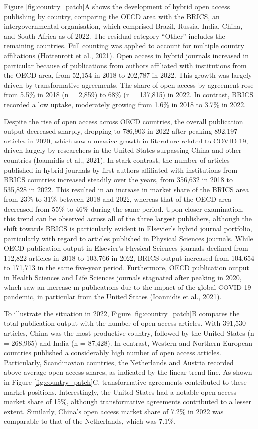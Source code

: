 \documentclass[a4paper,man,floatsintext,longtable,noextraspace,12pt]{apa6}
\begin{document}
Figure \ref{fig:country_patch}A shows the development of hybrid open
access publishing by country, comparing the OECD area with the BRICS, an
intergovernmental organisation, which comprised Brazil, Russia, India,
China, and South Africa as of 2022. The residual category ``Other''
includes the remaining countries. Full counting was applied to account
for multiple country affiliations (Hottenrott et al., 2021). Open access
in hybrid journals increased in particular because of publications from
authors affiliated with institutions from the OECD area, from 52,154 in
2018 to 202,787 in 2022. This growth was largely driven by
transformative agreements. The share of open access by agreement rose
from 5.5\% in 2018 (n = 2,859) to 68\% (n = 137,815) in 2022. In
contrast, BRICS recorded a low uptake, moderately growing from 1.6\% in
2018 to 3.7\% in 2022.

Despite the rise of open access across OECD countries, the overall
publication output decreased sharply, dropping to 786,903 in 2022 after
peaking 892,197 articles in 2020, which saw a massive growth in
literature related to COVID-19, driven largely by researchers in the
United States surpassing China and other countries (Ioannidis et al.,
2021). In stark contrast, the number of articles published in hybrid
journals by first authors affiliated with institutions from BRICS
countries increased steadily over the years, from 356,632 in 2018 to
535,828 in 2022. This resulted in an increase in market share of the
BRICS area from 23\% to 31\% between 2018 and 2022, whereas that of the
OECD area decreased from 55\% to 46\% during the same period. Upon
closer examination, this trend can be observed across all of the three
largest publishers, although the shift towards BRICS is particularly
evident in Elsevier's hybrid journal portfolio, particularly with regard
to articles published in Physical Sciences journals. While OECD
publication output in Elsevier's Physical Sciences journals declined
from 112,822 articles in 2018 to 103,766 in 2022, BRICS output increased
from 104,654 to 171,713 in the same five-year period. Furthermore, OECD
publication output in Health Sciences and Life Sciences journals
stagnated after peaking in 2020, which saw an increase in publications
due to the impact of the global COVID-19 pandemic, in particular from
the United States (Ioannidis et al., 2021).

To illustrate the situation in 2022, Figure \ref{fig:country_patch}B
compares the total publication output with the number of open access
articles. With 391,530 articles, China was the most productive country,
followed by the United States (n = 268,965) and India (n = 87,428). In
contrast, Western and Northern European countries published a
considerably high number of open access articles. Particularly,
Scandinavian countries, the Netherlands and Austria recorded
above-average open access shares, as indicated by the linear trend line.
As shown in Figure \ref{fig:country_patch}C, transformative agreements
contributed to these market positions. Interestingly, the United States
had a notable open access market share of 15\%, although transformative
agreements contributed to a lesser extent. Similarly, China's open
access market share of 7.2\% in 2022 was comparable to that of the
Netherlands, which was 7.1\%.
\end{document}
